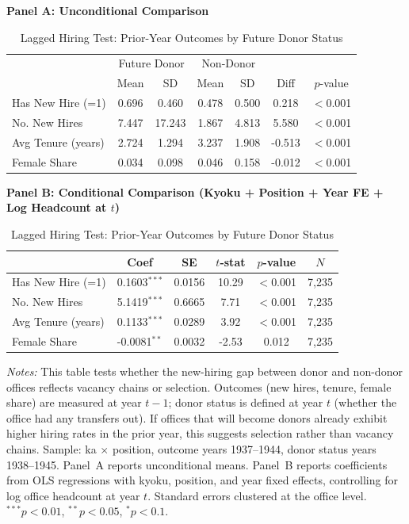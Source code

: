 \begin{table}[htbp]
\centering
\caption{Lagged Hiring Test: Prior-Year Outcomes by Future Donor Status}
\label{tab:donor_lagged}
\small
\begin{threeparttable}

\textbf{Panel A: Unconditional Comparison}
\medskip

\begin{tabular}{lcccccc}
\toprule
 & \multicolumn{2}{c}{Future Donor} & \multicolumn{2}{c}{Non-Donor} & & \\
 & Mean & SD & Mean & SD & Diff & $p$-value \\
\midrule
Has New Hire (=1) & 0.696 & 0.460 & 0.478 & 0.500 & 0.218 & $<$0.001 \\
No. New Hires & 7.447 & 17.243 & 1.867 & 4.813 & 5.580 & $<$0.001 \\
Avg Tenure (years) & 2.724 & 1.294 & 3.237 & 1.908 & -0.513 & $<$0.001 \\
Female Share & 0.034 & 0.098 & 0.046 & 0.158 & -0.012 & $<$0.001 \\
\bottomrule
\end{tabular}

\bigskip

\textbf{Panel B: Conditional Comparison (Kyoku + Position + Year FE + Log Headcount at $t$)}
\medskip

\begin{tabular}{lccccc}
\toprule
 & Coef & SE & $t$-stat & $p$-value & $N$ \\
\midrule
Has New Hire (=1) & 0.1603$^{***}$ & 0.0156 & 10.29 & $<$0.001 & 7,235 \\
No. New Hires & 5.1419$^{***}$ & 0.6665 & 7.71 & $<$0.001 & 7,235 \\
Avg Tenure (years) & 0.1133$^{***}$ & 0.0289 & 3.92 & $<$0.001 & 7,235 \\
Female Share & -0.0081$^{**}$ & 0.0032 & -2.53 & 0.012 & 7,235 \\
\bottomrule
\end{tabular}

\begin{tablenotes}[flushleft]
\footnotesize
\item \textit{Notes:} This table tests whether the new-hiring gap between donor and non-donor offices reflects vacancy chains or selection. Outcomes (new hires, tenure, female share) are measured at year $t{-}1$; donor status is defined at year $t$ (whether the office had any transfers out). If offices that will become donors already exhibit higher hiring rates in the prior year, this suggests selection rather than vacancy chains. Sample: ka $\times$ position, outcome years 1937--1944, donor status years 1938--1945. Panel~A reports unconditional means. Panel~B reports coefficients from OLS regressions with kyoku, position, and year fixed effects, controlling for log office headcount at year $t$. Standard errors clustered at the office level. $^{***}p<0.01$, $^{**}p<0.05$, $^{*}p<0.1$.
\end{tablenotes}
\end{threeparttable}
\end{table}
